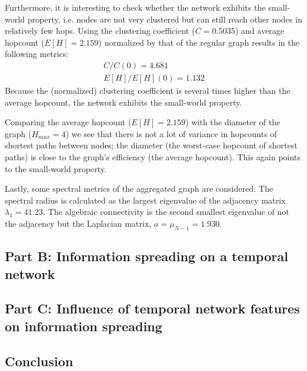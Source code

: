 \documentclass[letterpaper]{article}
\begin{document}
Furthermore, it is interesting to check whether the network exhibits the small-world property, i.e. nodes are not very clustered but can still reach other nodes in relatively few hops. Using the clustering coefficient (\(C=0.5035\)) and average hopcount (\(E[H]=2.159\)) normalized by that of the regular graph results in the following metrics: 
\begin{align*}
C/C(0) = 4.681\\
E[H]/E[H](0) = 1.132
\end{align*}
Because the (normalized) clustering coefficient is several times higher than the average hopcount, the network exhibits the small-world property. 


Comparing the average hopcount (\(E[H]=2.159\)) with the diameter of the graph (\(H_{max}=4\)) we see that there is not a lot of variance in hopcounts of shortest paths between nodes; the diameter (the worst-case hopcount of shortest paths) is close to the graph's efficiency (the average hopcount). This again points to the small-world property.

Lastly, some spectral metrics of the aggregated graph are considered. The spectral radius is calculated as the largest eigenvalue of the adjacency matrix \(\lambda_1=41.23\). The algebraic connectivity is the second smallest eigenvalue of not the adjacency but the Laplacian matrix, \(a=\mu_{N-1}=1.930\). 


\subsection*{Part B: Information spreading on a temporal network}
\todo{}


\subsection*{Part C: Influence of temporal network features on information spreading}
\todo{}


\subsection*{Conclusion}
\todo{}
\end{document}
